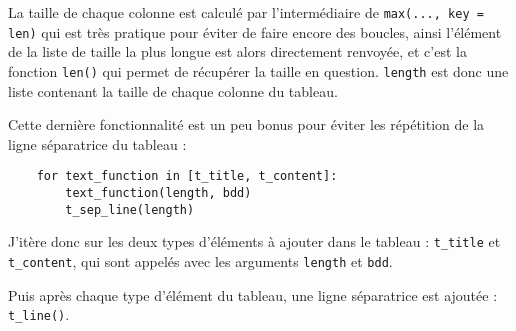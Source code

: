 \documentclass[a4paper,12pt]{article}
\begin{document}
La taille de chaque colonne est calculé par l'intermédiaire de \texttt{max(..., key = len)} qui est très pratique pour éviter de faire encore des boucles, ainsi l'élément de la liste de taille la plus longue est alors directement renvoyée, et c'est la fonction \texttt{len()} qui permet de récupérer la taille en question. \texttt{length} est donc une liste contenant la taille de chaque colonne du tableau.
\medskip

Cette dernière fonctionnalité est un peu bonus pour éviter les répétition de la ligne séparatrice du tableau :
\begin{lstlisting}
    for text_function in [t_title, t_content]:
        text_function(length, bdd)
        t_sep_line(length)
\end{lstlisting}
\medskip

J'itère donc sur les deux types d'éléments à ajouter dans le tableau : \texttt{t\_title} et \texttt{t\_content}, qui sont appelés avec les arguments \texttt{length} et \texttt{bdd}.
\medskip

Puis après chaque type d'élément du tableau, une ligne séparatrice est ajoutée : \texttt{t\_line()}.
\medskip
\end{document}
